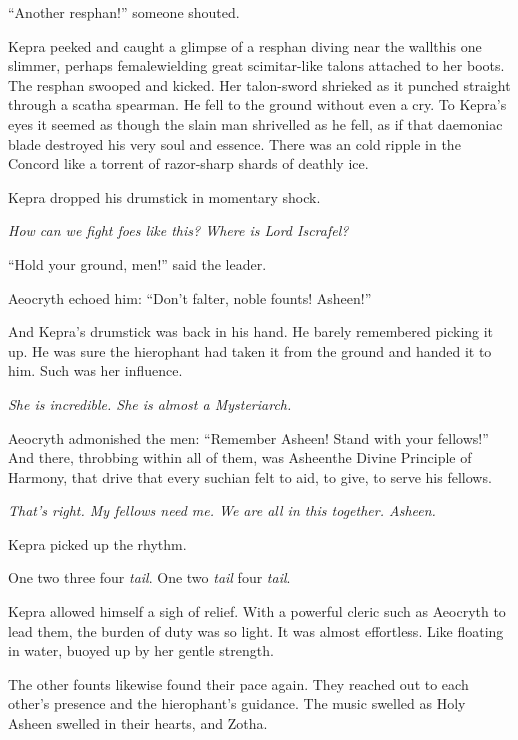\documentclass
  [a4paper,
   12pt,
   oneside
  ]%
  {article}
\newcommand{\drum}[1]{\textsf{#1}}
\begin{document}
``Another resphan!'' someone shouted. 

Kepra peeked and caught a glimpse of a resphan diving near the wall\dash{}this one slimmer, perhaps female\dash{}wielding great scimitar-like talons attached to her boots.
The resphan swooped and kicked. Her talon-sword shrieked as it punched straight through a scatha spearman. 
He fell to the ground without even a cry. 
To Kepra’s eyes it seemed as though the slain man shrivelled as he fell, as if that daemoniac blade destroyed his very soul and essence. There was an cold ripple in the Concord like a torrent of razor-sharp shards of deathly ice. 

Kepra dropped his drumstick in momentary shock. 

\emph{How can we fight foes like this? Where is Lord Iscrafel?}

``Hold your ground, men!'' said the leader.

Aeocryth echoed him: ``Don’t falter, noble founts! Asheen!''

And Kepra's drumstick was back in his hand. He barely remembered picking it up. 
He was sure the hierophant had taken it from the ground and handed it to him. Such was her influence. 

\emph{She is incredible. She is almost a Mysteriarch.}

Aeocryth admonished the men: ``Remember Asheen! Stand with your fellows!''
And there, throbbing within all of them, was Asheen\dash{}the Divine Principle of Harmony, that drive that every suchian felt to aid, to give, to serve his fellows.

\emph{That's right. My fellows need me. We are all in this together. Asheen.}

Kepra picked up the rhythm.

\drum{One two three four \emph{tail}. One two \emph{tail} four \emph{tail}.}

Kepra allowed himself a sigh of relief.
With a powerful cleric such as Aeocryth to lead them, the burden of duty was so light. 
It was almost effortless. 
Like floating in water, buoyed up by her gentle strength.

The other founts likewise found their pace again. 
They reached out to each other’s presence and the hierophant’s guidance. 
The music swelled as Holy Asheen swelled in their hearts, and Zotha.
\end{document}
